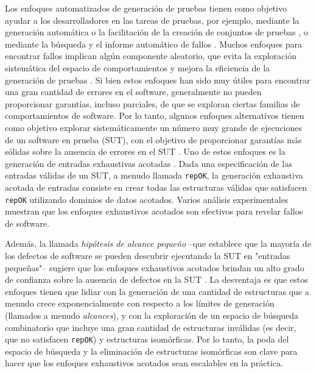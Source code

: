 Los enfoques automatizados de generación de pruebas tienen como objetivo ayudar a los desarrolladores en las tareas de pruebas, por ejemplo, mediante la generación automática o la facilitación de la creación de conjuntos de pruebas \cite{Cadar08,Luckow14,Fraser11}, o mediante la búsqueda y el informe automático de fallos \cite{Pacheco07,Ma15,Godefroid05,Marinov01,Boyapati02,Godefroid12}. Muchos enfoques para encontrar fallos implican algún componente aleatorio, que evita la exploración sistemática del espacio de comportamientos y mejora la eficiencia de la generación de pruebas \cite{Pacheco07,Ma15,Fraser11}. Si bien estos enfoques han sido muy útiles para encontrar una gran cantidad de errores en el software, generalmente no pueden proporcionar garantías, incluso parciales, de que se exploran ciertas familias de comportamientos de software. Por lo tanto, algunos enfoques alternativos tienen como objetivo explorar sistemáticamente un número muy grande de ejecuciones de un software en prueba (SUT), con el objetivo de proporcionar garantías más sólidas sobre la ausencia de errores en el SUT \cite{Marinov01,Boyapati02,Godefroid05,Godefroid18}. Uno de estos enfoques es la generación de entradas exhaustivas acotadas \cite{Marinov01,Boyapati02}. Dada una especificación de las entradas válidas de un SUT, a menudo llamada \texttt{repOK}, la generación exhaustiva acotada de entradas consiste en crear todas las estructuras válidas que satisfacen \texttt{repOK} utilizando dominios de datos acotados. Varios análisis experimentales muestran que los enfoques exhaustivos acotados son efectivos para revelar fallos de software.

Además, la llamada \emph{hipótesis de alcance pequeño} --que establece que la mayoría de los defectos de software se pueden descubrir ejecutando la SUT en "entradas pequeñas"-- sugiere que los enfoques exhaustivos acotados brindan un alto grado de confianza sobre la ausencia de defectos en la SUT \cite{Andoni02}. La desventaja es que estos enfoques tienen que lidiar con la generación de una cantidad de estructuras que a menudo crece exponencialmente con respecto a los límites de generación (llamados a menudo \emph{alcances}), y con la exploración de un espacio de búsqueda combinatorio que incluye una gran cantidad de estructuras inválidas (es decir, que no satisfacen \texttt{repOK}) y estructuras isomórficas. Por lo tanto, la poda del espacio de búsqueda y la eliminación de estructuras isomórficas son clave para hacer que los enfoques exhaustivos acotados sean escalables en la práctica.


